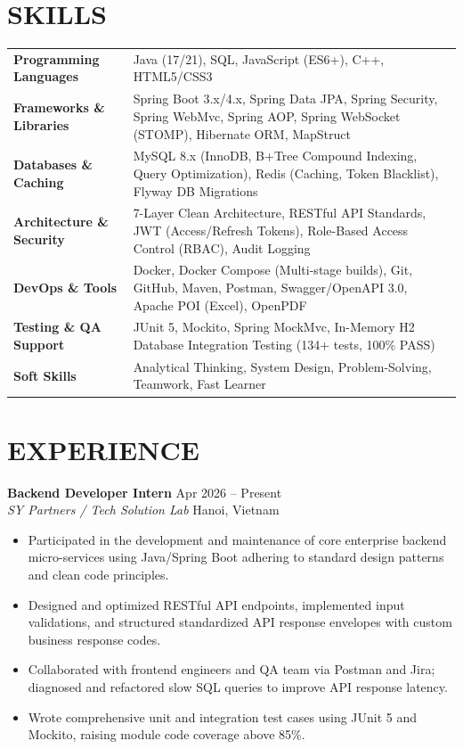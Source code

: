﻿\documentclass[11pt,a4paper]{article}
\begin{document}
\section*{SKILLS}
\begin{tabularx}{\textwidth}{@{}l X@{}}
\textbf{Programming Languages} & Java (17/21), SQL, JavaScript (ES6+), C++, HTML5/CSS3 \\
\textbf{Frameworks \& Libraries} & Spring Boot 3.x/4.x, Spring Data JPA, Spring Security, Spring WebMvc, Spring AOP, Spring WebSocket (STOMP), Hibernate ORM, MapStruct \\
\textbf{Databases \& Caching}   & MySQL 8.x (InnoDB, B+Tree Compound Indexing, Query Optimization), Redis (Caching, Token Blacklist), Flyway DB Migrations \\
\textbf{Architecture \& Security}& 7-Layer Clean Architecture, RESTful API Standards, JWT (Access/Refresh Tokens), Role-Based Access Control (RBAC), Audit Logging \\
\textbf{DevOps \& Tools}        & Docker, Docker Compose (Multi-stage builds), Git, GitHub, Maven, Postman, Swagger/OpenAPI 3.0, Apache POI (Excel), OpenPDF \\
\textbf{Testing \& QA Support}  & JUnit 5, Mockito, Spring MockMvc, In-Memory H2 Database Integration Testing (134+ tests, 100\% PASS) \\
\textbf{Soft Skills}            & Analytical Thinking, System Design, Problem-Solving, Teamwork, Fast Learner \\
\end{tabularx}

\section*{EXPERIENCE}
\noindent
\textbf{Backend Developer Intern} \hfill Apr 2026 -- Present \\
\textit{SY Partners / Tech Solution Lab} \hfill Hanoi, Vietnam
\begin{itemize}
    \item Participated in the development and maintenance of core enterprise backend micro-services using Java/Spring Boot adhering to standard design patterns and clean code principles.
    \item Designed and optimized RESTful API endpoints, implemented input validations, and structured standardized API response envelopes with custom business response codes.
    \item Collaborated with frontend engineers and QA team via Postman and Jira; diagnosed and refactored slow SQL queries to improve API response latency.
    \item Wrote comprehensive unit and integration test cases using JUnit 5 and Mockito, raising module code coverage above 85\%.
\end{itemize}
\end{document}
